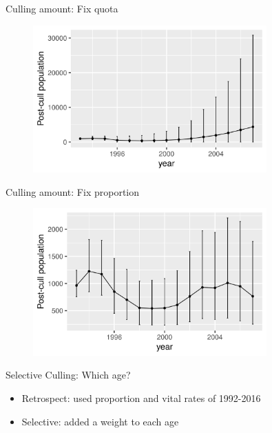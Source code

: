 \documentclass{beamer}
\begin{document}
\begin{frame}{Culling amount: Fix quota}
\begin{figure}[ht]
	\centering
	\includegraphics[width=0.8\textwidth]{fig/Chicago_deer/unif_quo.jpg}
	\label{quota}
\end{figure}
\end{frame}

\begin{frame}{Culling amount: Fix proportion}
\begin{figure}[ht]
	\centering
	\includegraphics[width=0.8\textwidth]{fig/Chicago_deer/unif_por.jpg}
	\label{proportion_unif}
\end{figure}
\end{frame}

\begin{frame}{Selective Culling: Which age?}
\begin{itemize}
	\item Retrospect: used proportion and vital rates of  1992-2016\\
	\item Selective: added a weight to each age 
\end{itemize}
\end{frame}
\end{document}
